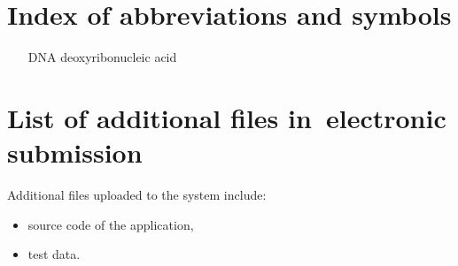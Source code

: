 \documentclass[a4paper,twoside,12pt]{book}
\begin{document}
\begin{appendices} 


 

\chapter*{Index of abbreviations and symbols}

\begin{itemize}
\item[DNA] deoxyribonucleic acid
\end{itemize}


\chapter*{List of additional files in~electronic submission}

Additional files uploaded to the system include:
\begin{itemize}
\item source code of the application,
\item test data.
\end{itemize}
 
\listoffigures
{}
\listoftables
{}

\end{appendices}
\end{document}
